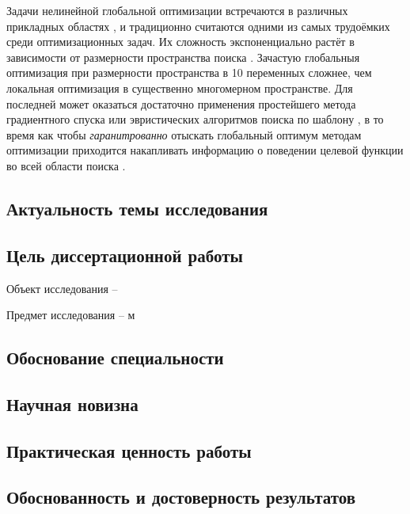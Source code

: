 
Задачи нелинейной глобальной оптимизации встречаются в различных прикладных областях \cite{Kvasov2013, Barkalov2013},
и традиционно считаются одними из самых трудоёмких среди оптимизационных задач.
Их сложность экспоненциально растёт в зависимости от размерности пространства поиска \cite{Vavasis1995}.
Зачастую глобальныя оптимизация при размерности пространства в 10 переменных сложнее,
чем локальная оптимизация в существенно многомерном пространстве.
Для последней может оказаться достаточно применения простейшего метода градиентного спуска
или эвристических алгоритмов поиска по шаблону \cite{torczon1997},
в то время как чтобы \textit{гаранитрованно} отыскать глобальный оптимум методам
оптимизации приходится накапливать информацию о поведении целевой функции во всей области поиска
\cite{Jones2009,Paulavicius2011,Evtushenko2013,Strongin2000}.





\subsection*{Актуальность темы исследования}

\subsection*{Цель диссертационной работы}


Объект исследования –

Предмет исследования – м

\subsection*{Обоснование специальности}

\subsection*{Научная новизна}

\subsection*{Практическая ценность работы}

\subsection*{Обоснованность и достоверность результатов}

